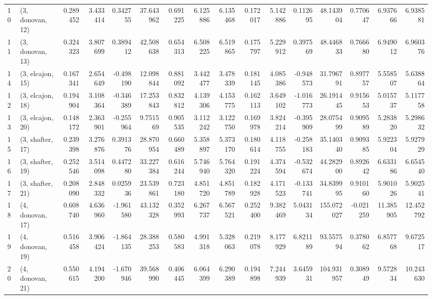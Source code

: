 \begin{tabular}{llrrrrrrrrrrrrrr}
10 &  (3, donovan, 12) &   0.289452 &  3.433414 &  0.342755 &  37.643962 &  0.691225 &   6.125886 &  6.135468 &  0.172017 &  5.142886 &  0.112695 &   48.143904 &  0.770647 &   6.937666 &   6.938581 \\
11 &  (3, donovan, 13) &   0.324323 &  3.807699 &  0.389412 &  42.508638 &  0.654313 &   6.508225 &  6.519865 &  0.175797 &  5.229912 &  0.397569 &   48.446833 &  0.766680 &   6.949012 &   6.960376 \\
14 &  (3, elcajon, 15) &   0.167341 &  2.654649 & -0.498190 &  12.098844 &  0.881092 &   3.442477 &  3.478339 &  0.181145 &  4.085386 & -0.948573 &   31.796791 &  0.897757 &   5.558507 &   5.638864 \\
12 &  (3, elcajon, 18) &   0.194904 &  3.108364 & -0.346389 &  17.253843 &  0.832812 &   4.139306 &  4.153775 &  0.162113 &  3.649102 & -1.016773 &   26.191445 &  0.915653 &   5.015737 &   5.117758 \\
13 &  (3, elcajon, 20) &   0.148172 &  2.363901 & -0.255964 &   9.751569 &  0.905535 &   3.112242 &  3.122750 &  0.169978 &  3.824214 & -0.395909 &   28.075499 &  0.909589 &   5.283820 &   5.298632 \\
15 &  (3, shafter, 17) &   0.239398 &  3.276876 &  0.391376 &  28.870954 &  0.660489 &   5.358897 &  5.373170 &  0.180614 &  4.118755 & -0.258183 &   35.140340 &  0.909385 &   5.922304 &   5.927929 \\
16 &  (3, shafter, 19) &   0.252546 &  3.514098 &  0.447280 &  33.227384 &  0.616244 &   5.746940 &  5.764320 &  0.191224 &  4.374594 & -0.532674 &   44.282900 &  0.892642 &   6.633186 &   6.654540 \\
17 &  (3, shafter, 21) &   0.208090 &  2.848332 &  0.025936 &  23.539861 &  0.723180 &   4.851720 &  4.851789 &  0.182928 &  4.171523 & -0.133741 &   34.839995 &  0.910160 &   5.901026 &   5.902541 \\
18 &  (4, donovan, 17) &   0.608740 &  4.636960 & -1.961580 &  43.132328 &  0.352993 &   6.267737 &  6.567521 &  0.252400 &  9.382469 &  5.043134 &  155.072027 & -0.021259 &  11.385905 &  12.452792 \\
19 &  (4, donovan, 19) &   0.516458 &  3.906424 & -1.864135 &  28.388253 &  0.580583 &   4.991318 &  5.328063 &  0.219078 &  8.177929 &  6.821189 &   93.557594 &  0.378062 &   6.857768 &   9.672517 \\
20 &  (4, donovan, 21) &   0.550615 &  4.194200 & -1.670946 &  39.568990 &  0.406445 &   6.064399 &  6.290389 &  0.194898 &  7.244939 &  3.645931 &  104.931957 &  0.308949 &   9.572834 &  10.243630 \\

\end{tabular}
